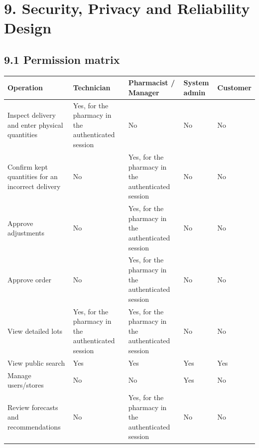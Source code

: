 \clearpage
\section{9. Security, Privacy and Reliability Design}\label{security-privacy-and-reliability-design}

\subsection{9.1 Permission matrix}\label{permission-matrix}

{\def\LTcaptype{none} %
\begin{longtable}[]{|
  >{\raggedright\arraybackslash}m{}|
  >{\raggedright\arraybackslash}m{}|
  >{\raggedright\arraybackslash}m{}|
  >{\raggedright\arraybackslash}m{}|
  >{\raggedright\arraybackslash}m{}|}
\hline
\begin{minipage}[c]{\linewidth}\raggedright
\textbf{Operation}
\end{minipage} & \begin{minipage}[c]{\linewidth}\raggedright
\textbf{Technician}
\end{minipage} & \begin{minipage}[c]{\linewidth}\raggedright
\textbf{Pharmacist / Manager}
\end{minipage} & \begin{minipage}[c]{\linewidth}\raggedright
\textbf{System admin}
\end{minipage} & \begin{minipage}[c]{\linewidth}\raggedright
\textbf{Customer}
\end{minipage} \\
\hline
\endhead

\endlastfoot
Inspect delivery and enter physical quantities & Yes, for the pharmacy in the authenticated session & No & No & No \\ \hline
Confirm kept quantities for an incorrect delivery & No & Yes, for the pharmacy in the authenticated session & No & No \\ \hline
Approve adjustments & No & Yes, for the pharmacy in the authenticated session & No & No \\ \hline
Approve order & No & Yes, for the pharmacy in the authenticated session & No & No \\ \hline
View detailed lots & Yes, for the pharmacy in the authenticated session & Yes, for the pharmacy in the authenticated session & No & No \\ \hline
View public search & Yes & Yes & Yes & Yes \\ \hline
Manage users/stores & No & No & Yes & No \\ \hline
Review forecasts and recommendations & No & Yes, for the pharmacy in the authenticated session & No & No \\ \hline
\end{longtable}
}

